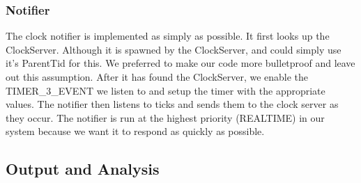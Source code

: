 \documentclass{article}
\begin{document}
\subsubsection{Notifier}

The clock notifier is implemented as simply as possible. It first looks up the ClockServer. Although it is spawned by the ClockServer, and could simply use it's ParentTid for this. We preferred to make our code more bulletproof and leave out this assumption. After it has found the ClockServer, we enable the TIMER\_3\_EVENT we listen to and setup the timer with the appropriate values. The notifier then listens to ticks and sends them to the clock server as they occur. The notifier is run at the highest priority (REALTIME) in our system because we want it to respond as quickly as possible.

\subsection{Output and Analysis}
\end{document}
